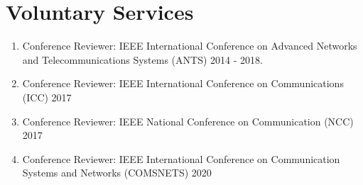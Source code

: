 \documentclass{article}
\begin{document}
\section{Voluntary Services}
  \begin{enumerate}
   \item Conference Reviewer: IEEE International Conference on Advanced Networks and Telecommunications Systems (ANTS) 2014 - 2018.
   \item Conference Reviewer: IEEE  International Conference on Communications (ICC) 2017
   \item Conference Reviewer: IEEE National Conference on Communication (NCC) 2017
      \item Conference Reviewer: IEEE  International Conference on Communication Systems and Networks (COMSNETS) 2020
  \end{enumerate}

   \nocite{*}
  
  
\end{document}

